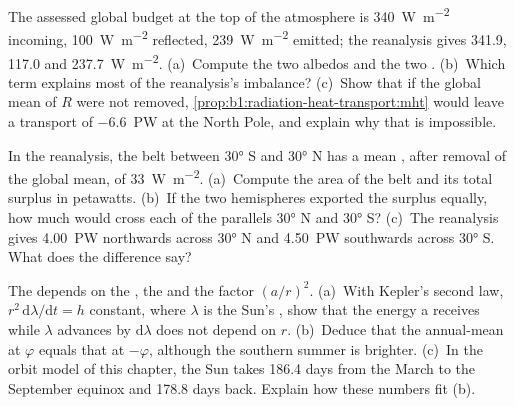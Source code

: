 \begin{exercise}[$\star\star$]\label{exo:b1:radiation-heat-transport:8}
The assessed global budget at the top of the atmosphere is \qty{340}{W.m^{-2}}
incoming, \qty{100}{W.m^{-2}} reflected, \qty{239}{W.m^{-2}} emitted; the reanalysis
gives \qty{341.9}{}, \qty{117.0}{} and \qty{237.7}{W.m^{-2}}. (a)~Compute the two
albedos and the two . (b)~Which term explains most of the
reanalysis's imbalance? (c)~Show that if the global mean of $R$ were not removed,
\cref{prop:b1:radiation-heat-transport:mht} would leave a transport of
\qty{-6.6}{PW} at the North Pole, and explain why that is impossible.
\end{exercise}

\begin{exercise}[$\star\star$]\label{exo:b1:radiation-heat-transport:9}
In the reanalysis, the belt between \ang{30} S and \ang{30} N has a mean , after removal of the global mean, of \qty{+33}{W.m^{-2}}. (a)~Compute the
area of the belt and its total surplus in petawatts. (b)~If the two hemispheres
exported the surplus equally, how much would cross each of the parallels \ang{30}
N and \ang{30} S? (c)~The reanalysis gives \qty{4.00}{PW} northwards across \ang{30}
N and \qty{4.50}{PW} southwards across \ang{30} S. What does the difference say?
\end{exercise}

\begin{exercise}[$\star\star\star$]\label{exo:b1:radiation-heat-transport:10}
The  depends on the , the  and the factor
$(a/r)^2$. (a)~With Kepler's second law, $r^2\,\mathrm d\lambda/\mathrm dt = h$
constant, where $\lambda$ is the Sun's  , show that the energy a
 receives while $\lambda$ advances by $\mathrm d\lambda$ does not depend on
$r$. (b)~Deduce that the annual-mean  at  $\varphi$ equals that at
$-\varphi$, although the southern summer is brighter. (c)~In the orbit model of this
chapter, the Sun takes \num{186.4} days from the March to the September equinox and
\num{178.8} days back. Explain how these numbers fit (b).
\end{exercise}

